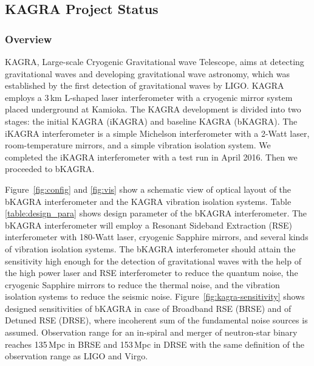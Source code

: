 \vspace{10pt}
\subsection*{\bi KAGRA Project Status}
\vspace{3pt}

\vspace{3pt}

\subsubsection*{\bf Overview}
KAGRA, Large-scale Cryogenic Gravitational wave Telescope, aims at detecting gravitational waves and developing gravitational wave astronomy, which was established by the first detection of gravitational waves by LIGO. KAGRA employs a 3\,km L-shaped laser interferometer with a cryogenic mirror system placed underground at Kamioka\cite{kagra_review}. The KAGRA development is divided into two stages: the initial KAGRA (iKAGRA) and baseline KAGRA (bKAGRA). The iKAGRA interferometer is a simple Michelson interferometer with a 2-Watt laser, room-temperature mirrors, and a simple vibration isolation system. We completed the iKAGRA interferometer with a test run in April 2016\cite{ikagra_paper}. Then we proceeded to bKAGRA. 






Figure~\ref{fig:config} and \ref{fig:vis} show a schematic view of optical layout of the bKAGRA interferometer and the KAGRA vibration isolation systems. Table \ref{table:design_para} shows design parameter of the bKAGRA interferometer\cite{phase1_paper}. The bKAGRA interferometer will employ a Resonant Sideband Extraction (RSE) interferometer with 180-Watt laser, cryogenic Sapphire mirrors, and several kinds of vibration isolation systems. The bKAGRA interferometer should attain the sensitivity high enough for the detection of gravitational waves with the help of the high power laser and RSE interferometer to reduce the quantum noise, the cryogenic Sapphire mirrors to reduce the thermal noise, and the vibration isolation systems to reduce the seismic noise. Figure~\ref{fig:kagra-sensitivity} shows designed sensitivities of bKAGRA in case of Broadband RSE (BRSE) and of Detuned RSE (DRSE), where incoherent sum of the fundamental noise sources is assumed. Observation range for an in-spiral and merger of neutron-star binary reaches 135\,Mpc in BRSE and 153\,Mpc in DRSE with the same definition of the observation range as LIGO and Virgo. 



